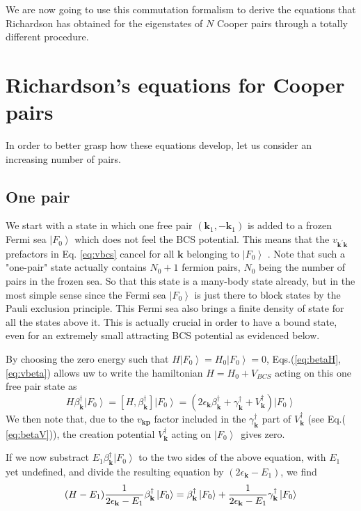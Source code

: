 \documentclass[aps,prb,superscriptaddress,twocolumn]{revtex4}
\newcommand{\vk}{\ensuremath{\mathbf{k}}}
\begin{document}
We are now going to use this commutation formalism to derive the equations that Richardson has obtained for the eigenstates of $N$ Cooper pairs through a totally different procedure.

\section{Richardson's equations for Cooper pairs\label{sec:rich}}

In order to better grasp how these equations develop, let us consider an
increasing number of pairs.

\subsection{One pair}

We start with a state in which one free pair $(\mathbf{k} _1,-\mathbf{k} _1)$ is added to a
frozen Fermi sea $\left|F_0\right> $ which does not feel the BCS potential.
This means that the $v_{\mathbf{k} ^{\prime}\mathbf{k} }$ prefactors in Eq.%
\eqref{eq:vbcs} cancel for all $\mathbf{k} $ belonging to $\left|F_0\right> $%
. Note that such a "one-pair" state actually contains $N_0+1$ fermion pairs, 
$N_0$ being the number of pairs in the frozen sea. So that this state is a many-body state already, but in the most simple sense since the Fermi sea $%
\left|F_0\right> $ is just there to block states by the Pauli exclusion
principle. This Fermi sea also brings a finite density of state for all the
states above it. This is actually crucial in order to have a bound state,
even for an extremely small attracting BCS potential as evidenced below.

By choosing the zero energy such
that $H\left|F_0\right> =H_0\left|F_0\right> =0$, Eqs.(\ref{eq:betaH},\ref{eq:vbeta}) allows uw to write the hamiltonian $H=H_0+V_{BCS}$
acting on this one free pair state as 
\begin{equation}
H\beta^{\dagger}_\vk\left|F_0\right>  =\left[H,\beta^{\dagger}_\vk\right] 
\left|F_0\right> 
=\left(2\epsilon_\vk\beta^{\dagger}_\vk+\gamma^{\dagger}_\vk+V^{\dagger}_\vk%
\right) \left|F_0\right>  
\end{equation}
We then note that, due to the $v_{\mathbf{k} \mathbf{p} }$ factor included
in the $\gamma^{\dagger}_{\mathbf{k} }$ part of $V^{\dagger}_\vk$ (see Eq.(%
\ref{eq:betaV})), the creation potential $V^{\dagger}_\vk$ acting on $%
\left|F_0\right> ${\ }gives zero.

If we now substract $E _1\beta^{\dagger}_\vk\left|F_0\right>  $ to
the two sides of the above equation, with $E_1$ yet undefined, and divide the resulting equation by $%
\left(2\epsilon_\vk-E _1\right) $, we find 
\begin{equation}  \label{eq:HE1}
 (H-E_1)\frac{1}{2\epsilon_\vk-E _1} \beta^{\dagger}_\vk%
\left|F_0\right>  =\beta^{\dagger}_\vk\left|F_0\right>  +\frac{1}{%
2\epsilon_\vk-E _1} \gamma^{\dagger}_\vk\left|F_0\right>  
\end{equation}
\end{document}
